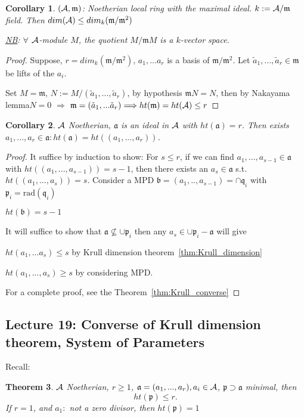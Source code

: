 \documentclass[11pt]{article}
\newtheorem{thm}{Theorem}[section]
\newtheorem{cor}[thm]{Corollary}
\newcommand{\sca}{{\mathfrak a}}
\newcommand{\scb}{{\mathfrak b}}
\newcommand{\scm}{{\mathfrak m}}
\newcommand{\scp}{{\mathfrak p}}
\newcommand{\scq}{\mathfrak q}
\newcommand{\cala}{{\cal A}}
\newcommand{\Lrta}{\Longrightarrow}
\begin{document}
\begin{cor}
$(\cala,\scm)$: Noetherian local ring with the maximal ideal. $k:=\cala/\scm$ field. Then $dim(\cala)\leq dim_k(\scm/\scm^2)$

\underline{NB}: $\forall$ $\cala$-module $M$, the quotient $M/\scm M$ is a $k$-vector space.
\end{cor}
\begin{proof}
Suppose, $r=dim_k(\scm/\scm^2)$, $a_1,...a_r$ is a basis of $\scm/\scm^2$. Let $\tilde{a}_1,...,\tilde{a}_r\in\scm$ be lifts of the $a_i$. 

Set $M=\scm$, $N:=M/(\tilde{a}_1,...,\tilde{a}_r)$, by hypothesis $\scm N=N$, then by Nakayama lemma$N=0$ $\Lrta$ $\scm=(\tilde{a}_1,...\tilde{a}_r)\Lrta ht(\scm)=ht(\cala)\leq r$
\end{proof}

\begin{cor}
$\cala$ Noetherian, $\sca$ is an ideal in $\cala$ with $ht(\sca)=r$. Then exists $a_1,...,a_r\in\sca:ht(\sca)=ht((a_1,...,a_r))$.
\end{cor}
\begin{proof}
It suffice by induction to show: For $s\leq r$, if we can find $a_1,...,a_{s-1}\in\sca$ with $ht((a_1,...,a_{s-1}))=s-1$, then there exists an $a_s\in\sca$ s.t. $ht((a_1,...,a_s))=s$.
Consider a MPD $\scb=(a_1,..,a_{s-1})=\cap\scq_i$ with $\scp_i=\text{rad}(\scq_i)$

$ht(\scb)=s-1$

It will suffice to show that $\sca\not\subseteq \cup\scp_i $
then any $a_s\in\cup \scp_i-\sca$ will give 

$ht(a_1,...a_s)\leq s$ by Krull dimension theorem~\ref{thm:Krull_dimension}

$ht(a_1,...,a_s)\geq s$ by considering MPD.

For a complete proof, see the Theorem~\ref{thm:Krull_converse}
\end{proof}



\subsection{Lecture 19: Converse of Krull dimension theorem, System of Parameters}
Recall: 
\begin{thm}\label{thm:thm0}
$\cala$ Noetherian, $r\geq 1$, $\sca=(a_1,...,a_r), a_i\in\cala$, $\scp\supset \sca$ minimal, then 
$$
ht(\scp)\leq r.
$$
If $r=1$, and $a_1:$ not a zero divisor, then $ht(\scp)=1$
\end{thm}
\end{document}
